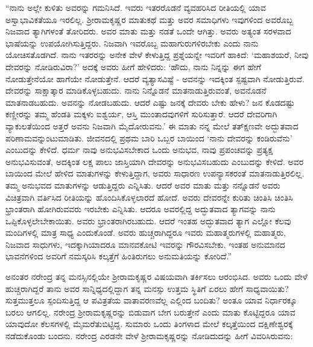 “ನಾನು ಅಲ್ಲೇ ಕುಳಿತು ಅವರನ್ನು ಗಮನಿಸಿದೆ. ಇವರು ಇತರರೊಡನೆ ವ್ಯವಹರಿಸಿದ ರೀತಿಯಲ್ಲಿ ಯಾವ ಅಸ್ವಾಭಾವಿಕತೆಯೂ ಇರಲಿಲ್ಲ. ಶ‍್ರೀರಾಮಕೃಷ್ಣರ ಮಾತುಕಥೆ ಮತ್ತು ಅವರ ಸಮಾಧಿಗಳು ಇವುಗಳಿಂದ ಅವರೊಬ್ಬ ನಿಜವಾದ ತ್ಯಾಗಿಗಳಂತೆ ತೋರಿದರು. ಅವರ ಮಾತು ಮತ್ತು ನಡತೆ ಒಂದೇ ಆಗಿತ್ತು. ಅವರು ಅತ್ಯಂತ ಸರಳವಾದ ಭಾಷೆಯನ್ನು ಉಪಯೋಗಿಸುತ್ತಿದ್ದರು. ನಿಜವಾಗಿ ಇವರೊಬ್ಬ ಮಹಾಗುರುಗಳಿರಬೇಕು ಎಂದು ನಾನು ಯೋಚಿಸತೊಡಗಿದೆ. ನಾನು ಇತರರನ್ನು ಅನೇಕ ವೇಳೆ ಕೇಳುತ್ತಿದ್ದ ಪ್ರಶ್ನೆಯನ್ನೇ ಇವರಿಗೆ ಹಾಕಿದೆ: ‘ಮಹಾಶಯರೆ, ನೀವು ದೇವರನ್ನು ನೋಡಿರುವಿರಾ?’ ಅದಕ್ಕೆ ಅವರು ಹೀಗೆ ಹೇಳಿದರು: ‘ಹೌದು, ನಾನು ನಿನ್ನನ್ನು ಈಗ ಹೇಗೆ ನೋಡುತ್ತೇನೆಯೋ ಹಾಗೆಯೇ ನೋಡುತ್ತೇನೆ. ಆದರೆ ವ್ಯತ್ಯಾಸವಿಷ್ಟೆ - ಅವನನ್ನು ಇದಕ್ಕಿಂತ ಸ್ಪಷ್ಟವಾಗಿ ನೋಡುತ್ತಿರುವೆ. ದೇವರನ್ನು ಸಾಕ್ಷಾತ್ಕಾರ ಮಾಡಿಕೊಳ್ಳಬಹುದು. ನಾನು ನಿನ್ನೊಡನೆ ಮಾತನಾಡುತ್ತಿರುವಂತೆ, ಅವನೊಡನೆ ಮಾತನಾಡಬಹುದು. ಅವನನ್ನು ನೋಡಬಹುದು. ಆದರೆ ಎಷ್ಟು ಜನಕ್ಕೆ ದೇವರು ಬೇಕು ಹೇಳು? ಜನ ಕೊಡದಷ್ಟು ಕಣ್ಣೀರನ್ನು ತಮ್ಮ ಹೆಂಡತಿ ಮಕ್ಕಳು ಐಶ್ವರ್ಯ, ಆಸ್ತಿ ಮುಂತಾದವುಗಳಿಗೆ ಸುರಿಸುತ್ತಾರೆ. ಆದರೆ ದೇವರಿಗಾಗಿ ವ್ಯಾಕುಲತೆಯಿಂದ ಅತ್ತರೆ ಅವನು ನಿಜವಾಗಿ ಮೈದೋರುವನು.’ ಈ ಮಾತು ನನ್ನ ಮೇಲೆ ತತ್‍ಕ್ಷಣವೇ ಅದ್ಭುತವಾದ ಪರಿಣಾಮವನ್ನುಂಟುಮಾಡಿತು. ಜೀವನದಲ್ಲಿ ಪ್ರಥಮ ಬಾರಿ ಒಬ್ಬರ ಬಾಯಿಂದ ‘ನಾನು ದೇವರನ್ನು ಕಂಡಿರುವೆನು’ ಎಂಬುದನ್ನು ಕೇಳಿದೆ. ಧರ್ಮ ನಾವು ಅನುಭವಿಸಬೇಕಾದ ಒಂದು ಅನುಭವ, ನಾವು ಪ್ರಪಂಚವನ್ನು ಪ್ರತ್ಯಕ್ಷ ಅನುಭವಿಸುವಂತೆ, ಅದಕ್ಕಿಂತ ಲಕ್ಷ ಪಾಲು ಜಾಸ್ತಿಯಾಗಿ ದೇವರನ್ನು ಅನುಭವಿಸಬಹುದು ಎಂಬುದನ್ನು ಕೇಳಿದೆ. ಅವರ ಬಾಯಿಂದ ಮೇಲೆ ಹೇಳಿದ ಮಾತುಗಳನ್ನು ಕೇಳುತ್ತಿದ್ದಾಗ, ಅವರು ಸಾಧಾರಣ ಉಪನ್ಯಾಸಕರಂತೆ ಮಾತನಾಡುತ್ತಿರಲಿಲ್ಲ. ತಮ್ಮ ಅನುಭವದ ಮಾತುಗಳನ್ನು ಆಡುತ್ತಿದ್ದರು ಎನ್ನಿಸಿತು. ಆದರೆ ಅವರ ಮಾತು ಮತ್ತು ನನ್ನೊಡನೆ ಅವರು ವಿಚಿತ್ರವಾಗಿ ವರ್ತಿಸಿದ ರೀತಿಯನ್ನು ಹೊಂದಿಸಿಕೊಳ್ಳಲಾರದೆ ಹೋದೆ. ಅವರು ದೇವರನ್ನೇ ಕುರಿತು ಚಿಂತಿಸಿ ಚಿಂತಿಸಿ ಭ್ರಾಂತರಾಗಿ ಹೋಗಿರುವವರು ಇರಬೇಕು ಎನ್ನಿಸಿತು. ಆದರೂ ಅವರಲ್ಲಿದ್ದ ಅದ್ಭುತವಾದ ತ್ಯಾಗವನ್ನು ನಾನು ಒಪ್ಪಿಕೊಳ್ಳಲೇಬೇಕಾಯಿತು. ಅವರು ಭ್ರಾಂತರಾಗಿರಬಹುದು. ಆದರೆ ಇಂತಹ ಅದ್ಭುತವಾದ ತ್ಯಾಗ ಎಲ್ಲೋ ಕೆಲವು ಮಂದಿಗಳಲ್ಲಿ ಮಾತ್ರ ಸಾಧ್ಯ ಎಂದುಕೊಂಡೆ. ಅವರು ಹುಚ್ಚರಾಗಿದ್ದರೂ ಇವರು ಮಹಾತ್ಮರುಗಳಲ್ಲಿ ಮಹಾತ್ಮರು, ನಿಜವಾದ ಸಾಧುಗಳು, ಇದಕ್ಕಾಗಿಯಾದರೂ ಮಾನವಕೋಟಿ ಇವರನ್ನು ಗೌರವಿಸಬೇಕು. ಇಂತಹ ಅನುಮಾನದ ಭಾವನೆಗಳಿಂದ ಅವರಿಗೆ ನಮಸ್ಕರಿಸಿ ಕಲ್ಕತ್ತೆಗೆ ಹಿಂತಿರುಗಲು ಅನುಮತಿಯನ್ನು ಕೋರಿದೆ.”

ಅನಂತರ ನರೇಂದ್ರ ತನ್ನ ಮನಸ್ಸಿನಲ್ಲಿಯೇ ಶ‍್ರೀರಾಮಕೃಷ್ಣರ ವಿಷಯವಾಗಿ ತರ್ಕಿಸಲು ಆರಂಭಿಸಿದ. ಅವರು ಒಂದು ವೇಳೆ ಹುಚ್ಚರಾಗಿದ್ದರೆ ತಾನು ಅವರ ಸಾನ್ನಿಧ್ಯದಲ್ಲಿದ್ದಾಗ ತನ್ನ ಮನಸ್ಸು ಉತ್ತಮ ಸ್ಥಿತಿಗೆ ಏರಲು ಹೇಗೆ ಸಾಧ್ಯವಾಯಿತು? ಸುತ್ತಮುತ್ತಲೂ ಸ್ಪಂದಿಸುತ್ತಿದ್ದ ಆ ಪವಿತ್ರತೆಯ ವಾತಾವರಣವೆಲ್ಲ ಎಲ್ಲಿಂದ ಬಂದಿತು? ಅಂತೂ ಯಾವ ನಿರ್ಧಾರಕ್ಕೂ ಬರಲು ಆಗಲಿಲ್ಲ. ನರೇಂದ್ರ ಶ‍್ರೀರಾಮಕೃಷ್ಣರನ್ನು ಬಿಡುವಾಗ ಬೇಗ ಬರುತ್ತೇನೆ ಎಂದು ಮಾತು ಕೊಟ್ಟಿದ್ದರೂ ಯಾವ ಯಾವುದೋ ಕೆಲಸಗಳಲ್ಲಿ ಮೈಮರೆತುಬಿಟ್ಟಿದ್ದ. ಸುಮಾರು ಒಂದು ತಿಂಗಳಾದ ಮೇಲೆ ಕಲ್ಕತ್ತೆಯಿಂದ ದಕ್ಷಿಣೇಶ್ವರಕ್ಕೆ ನಡೆದುಕೊಂಡು ಬಂದನು. ನರೇಂದ್ರ ಎರಡನೇ ವೇಳೆ ಶ‍್ರೀರಾಮಕೃಷ್ಣರನ್ನು ನೋಡಿದುದನ್ನು ಹೀಗೆ ವಿವರಿಸಿರುವನು:

